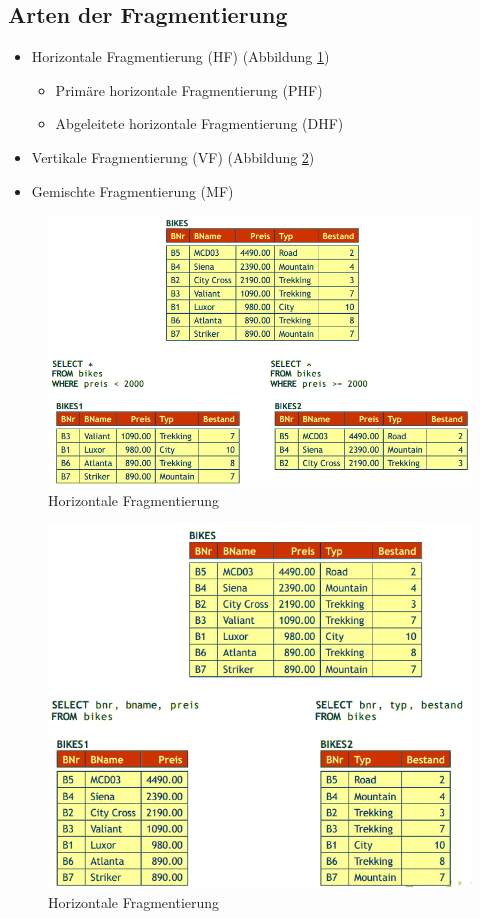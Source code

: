 \documentclass[a4paper,11pt]{article}
\begin{document}
\subsection{Arten der Fragmentierung}
\begin{itemize}
\item Horizontale Fragmentierung (HF) (Abbildung \ref{fig:horizontalFrag})
\begin{itemize}
\item Primäre horizontale Fragmentierung (PHF)
\item Abgeleitete horizontale Fragmentierung (DHF)
\end{itemize}
\item Vertikale Fragmentierung (VF) (Abbildung \ref{fig:verticalFrag})
\item Gemischte Fragmentierung (MF)
\end{itemize}
\begin{figure}[ht]
  \includegraphics[scale=0.75]{src/horizontale_fragmentierung.png}
	\caption{Horizontale Fragmentierung}
	\label{fig:horizontalFrag}
\end{figure}
\begin{figure}[ht]
  \includegraphics[scale=0.75]{src/vertikale_fragmentierung.png}
	\caption{Horizontale Fragmentierung}
	\label{fig:verticalFrag}
\end{figure}
\end{document}
